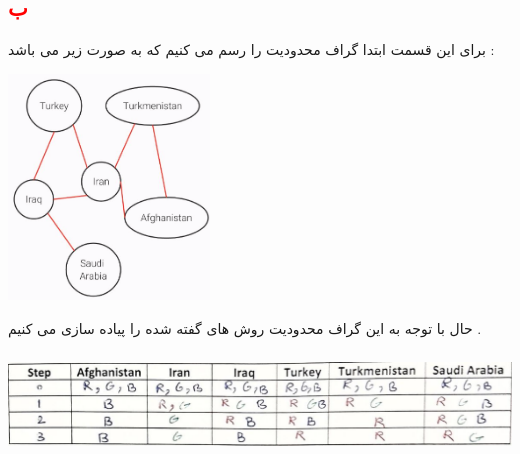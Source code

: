 \documentclass{article}
\begin{document}
\subsection*{\textcolor{red}{ب}}
برای این قسمت ابتدا گراف محدودیت را رسم می کنیم که به صورت زیر می باشد  : 
\begin{center}
	\includegraphics[width=0.4\textwidth]{q6p1}
\end{center}
حال با توجه به این گراف محدودیت روش های گفته شده را پیاده سازی می کنیم  . 
\subsubsection*{\textcolor{red}{}}
\begin{center}
	\includegraphics[width=1\textwidth]{fc}
\end{center}
\end{document}
